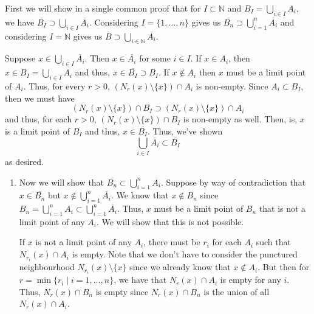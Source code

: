 \documentclass[12 pt, letterpaper]{hmcpset}
\begin{document}
\begin{solution}
	First we will show in a single common proof that for $I \subset \mathbb{N}$ and $B_{I} = \bigcup_{i \in I} A_{i}$, we have $\overline{B_{I}} \supset \bigcup_{i \in I} \overline{A_{i}}$. Considering $I = \{ 1, \dots, n \}$ gives us $\overline{B_{n}} \supset \bigcup_{i = 1}^{n} \overline{A_{i}}$ and considering $I = \mathbb{N}$ gives us $\overline{B} \supset \bigcup_{i \in \mathbb{N}} \overline{A_{i}}$.

	Suppose $x \in \bigcup_{i \in I} \overline{A_{i}}$. Then $x \in \overline{A_{i}}$ for some $i \in I$. If $x \in A_{i}$, then $x \in B_{I} = \bigcup_{i \in I} A_{i}$ and thus, $x \in \overline{B_{I}} \supset B_{I}$. If $x \notin A_{i}$ then $x$ must be a limit point of $A_{i}$. Thus, for every $r > 0$, $(N_{r}(x) \setminus \{ x \}) \cap A_{i}$ is non-empty. Since $A_{i} \subset B_{I}$, then we must have 
	\[
		(N_{r}(x) \setminus \{ x \}) \cap B_{I} \supset (N_{r}(x) \setminus \{ x \}) \cap A_{i}
	\]
	and thus, for each $r > 0$, $(N_{r}(x) \setminus \{ x \}) \cap B_{I}$ is non-empty as well. Then, is, $x$ is a limit point of $B_{I}$ and thus, $x \in \overline{B_{I}}$. Thus, we've shown
	\[
		\bigcup_{i \in I} \overline{A_{i}} \subset \overline{B_{I}}
	\]
	as desired.
	\begin{enumerate}
		\item Now we will show that $\overline{B_{n}} \subset \bigcup_{i = 1}^{n} \overline{A_{i}}$. Suppose by way of contradiction that $x \in \overline{B_{n}}$ but $x \notin \bigcup_{i = 1}^{n} \overline{A_{i}}$. We know that $x \notin B_{n}$ since $B_{n} = \bigcup_{i = 1}^{n} A_{i} \subset \bigcup_{i = 1}^{n} \overline{A_{i}}$. Thus, $x$ must be a limit point of $B_{n}$ that is not a limit point of any  $A_{i}$. We will show that this is not possible.

			If $x$ is not a limit point of any $A_{i}$, there must be $r_{i}$ for each $A_{i}$ such that $N_{r_{i}}(x) \cap A_{i}$ is empty. Note that we don't have to consider the punctured neighbourhood $N_{r_{i}}(x) \setminus \{ x \}$ since we already know that $x \notin A_{i}$. But then for $r = \min \{ r_{i} \mid i = 1, \dots, n \}$, we have that $N_{r}(x) \cap A_{i}$ is empty for any $i$. Thus, $N_{r}(x) \cap B_{n}$ is empty since $N_{r}(x) \cap B_{n}$ is the union of all $N_{r}(x) \cap A_{i}$.


\end{enumerate}
\end{solution}
\end{document}
